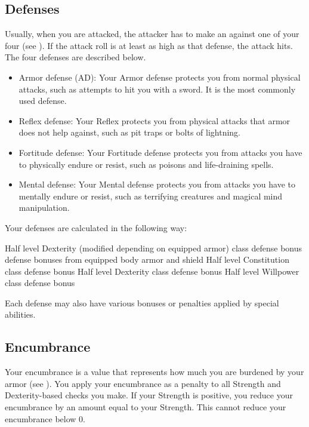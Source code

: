     \subsection{Defenses}\label{Defenses}
        Usually, when you are attacked, the attacker has to make an  against one of your four  (see ).
        If the attack roll is at least as high as that defense, the attack hits.
        The four defenses are described below.
        \begin{itemize}
            \item Armor defense (AD): Your Armor defense protects you from normal physical attacks, such as attempts to hit you with a sword.
                It is the most commonly used defense.
            \item Reflex defense: Your Reflex protects you from physical attacks that armor does not help against, such as pit traps or bolts of lightning.
            \item Fortitude defense: Your Fortitude defense protects you from attacks you have to physically endure or resist, such as poisons and life-draining spells.
            \item Mental defense: Your Mental defense protects you from attacks you have to mentally endure or resist, such as terrifying creatures and magical mind manipulation.
        \end{itemize}

        Your defenses are calculated in the following way:
        \begin{itemize}
             Half level \add Dexterity (modified depending on equipped armor) \add class defense bonus \add defense bonuses from equipped body armor and shield
             Half level \add Constitution \add class defense bonus
             Half level \add Dexterity \add class defense bonus
             Half level \add Willpower \add class defense bonus
        \end{itemize}
        Each defense may also have various bonuses or penalties applied by special abilities.

    \subsection{Encumbrance}\label{Encumbrance}
        Your encumbrance is a value that represents how much you are burdened by your armor (see ).
        You apply your encumbrance as a penalty to all Strength and Dexterity-based checks you make.
        If your Strength is positive, you reduce your encumbrance by an amount equal to your Strength.
        This cannot reduce your encumbrance below 0.

